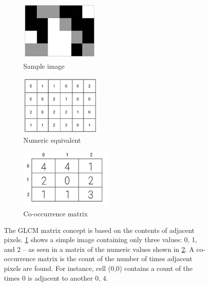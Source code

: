 \documentclass[letterpaper, notitlepage]{report}
\begin{document}
\begin{figure}[H]
	\begin{subfigure}[h]{0.28\linewidth}
		\includegraphics[height=3cm]{./figures/glcm-example.jpg}
		\caption{Sample image}
		\label{subfig:glcm_sample}	
	\end{subfigure}
	\hfill
	\begin{subfigure}[h]{0.28\linewidth}
		\includegraphics[height=3cm]{./figures/glcm-numeric.jpg}
		\caption{Numeric equivalent}
		\label{subfig:glcm_numeric}		
	\end{subfigure}
	\hfill
	\begin{subfigure}[h]{0.28\linewidth}
		\includegraphics[height=3cm]{./figures/glcm-matrix.jpg}
		\caption{Co-occurrence matrix}
		\label{subfig:glcm_matrix}		
	\end{subfigure}%
	\hfill
	\caption[GLCM matrix explained]{The GLCM matrix concept is based on the contents of adjacent pixels. \ref{subfig:glcm_sample} shows a simple image containing only three values: 0, 1, and 2 -- as seen in a matrix of the numeric values shown in \ref{subfig:glcm_numeric}. A co-occurrence matrix is the count of the number of times adjacent pixels are found.  For instance, cell (0,0) contains a count of the times $0$ is adjacent to another $0$, $4$.}
	\label{fig:glcm-explained}
\end{figure}
\end{document}
